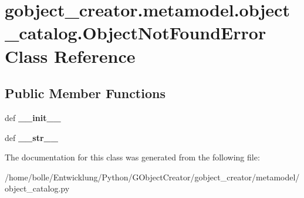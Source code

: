 \hypertarget{classgobject__creator_1_1metamodel_1_1object__catalog_1_1ObjectNotFoundError}{
\section{gobject\_\-creator.metamodel.object\_\-catalog.ObjectNotFoundError Class Reference}
\label{classgobject__creator_1_1metamodel_1_1object__catalog_1_1ObjectNotFoundError}
}
\subsection*{Public Member Functions}
\begin{DoxyCompactItemize}
\item 
\hypertarget{classgobject__creator_1_1metamodel_1_1object__catalog_1_1ObjectNotFoundError_aa50aa4623879dde8fe234a7a9d20a037}{
def {\bfseries \_\-\_\-init\_\-\_\-}}
\label{classgobject__creator_1_1metamodel_1_1object__catalog_1_1ObjectNotFoundError_aa50aa4623879dde8fe234a7a9d20a037}

\item 
\hypertarget{classgobject__creator_1_1metamodel_1_1object__catalog_1_1ObjectNotFoundError_abf94bb6a1ffa7715f94a4812dd70bfbf}{
def {\bfseries \_\-\_\-str\_\-\_\-}}
\label{classgobject__creator_1_1metamodel_1_1object__catalog_1_1ObjectNotFoundError_abf94bb6a1ffa7715f94a4812dd70bfbf}

\end{DoxyCompactItemize}


The documentation for this class was generated from the following file:\begin{DoxyCompactItemize}
\item 
/home/bolle/Entwicklung/Python/GObjectCreator/gobject\_\-creator/metamodel/object\_\-catalog.py\end{DoxyCompactItemize}
